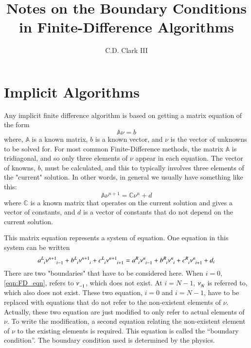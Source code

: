 \documentclass[letterpaper,12pt]{article}
\title{Notes on the Boundary Conditions in Finite-Difference Algorithms}
\author{C.D. Clark III}
\begin{document}
\maketitle


\section{Implicit Algorithms}
Any implicit finite difference algorithm is based on getting a matrix equation of the form
\begin{equation}
\mathbb{A} \nu = b
\end{equation}
where, $\mathbb{A}$ is a known matrix, $b$ is a known vector, and $\nu$ is the vector of unknowns to be solved for.
For most common Finite-Difference methods, the matrix $\mathbb{A}$ is tridiagonal, and so only three elements of $\nu$ appear in each equation. The vector of knowns, $b$, must be calculated, and this to typically involves three elements of the "current" solution. In other words, in general we usually have something like this:
\begin{equation}
  \mathbb{A} \nu^{n+1} = \mathbb{C} \nu^{n} + d
\end{equation}
where $\mathbb{C}$ is a known matrix that operates on the current solution and gives a vector of constants, and $d$ is a vector of constants that do not depend on the current solution.

This matrix equation represents a system of equation. One equation in this system can be written
\begin{equation}
  \label{eqn:FD_eqn}
  a\indices{^L_i} \nu\indices{^{n+1}_{i-1}}
+ b\indices{^L_i} \nu\indices{^{n+1}_{i  }}
+ c\indices{^L_i} \nu\indices{^{n+1}_{i+1}}
=
  a\indices{^R_i} \nu\indices{^{n  }_{i-1}}
+ b\indices{^R_i} \nu\indices{^{n  }_{i  }}
+ c\indices{^R_i} \nu\indices{^{n  }_{i+1}}
+ d_i
\end{equation}
There are two "boundaries" that have to be considered here. When $i = 0$,
\ref{eqn:FD_eqn}, refers to $\nu\indices{_{-1}}$, which does not exist. At $i =
N-1$, $\nu\indices{_N}$ is referred to, which also does not exist. These two
equation, $i = 0$ and $i = N-1$, have to be replaced with equations that do not
refer to the non-existent elements of $\nu$. Actually, these two equation are
just modified to only refer to actual elements of $\nu$.  To write the
modification, a second equation relating the non-existent element of $\nu$ to
the existing elements is required. This equation is called the ``boundary
condition''. The boundary condition used is determined by the physics.
\end{document}
